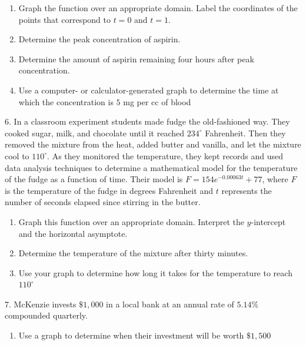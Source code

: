 \documentclass[10pt,]{book}
\theoremstyle{plain}
\theoremstyle{definition}
\theoremstyle{definition}
\theoremstyle{definition}
\numberwithin{equation}{section}
\begin{document}
\begin{exerciselist}
\leavevmode%
\begin{enumerate}[label=(\alph*)]
\item\hypertarget{li-142}{}Graph the function over an appropriate domain. Label the coordinates of the points that correspond to \(t=0\) and \(t=1\).%
\item\hypertarget{li-143}{}Determine the peak concentration of aspirin.%
\item\hypertarget{li-144}{}Determine the amount of aspirin remaining four hours after peak concentration.%
\item\hypertarget{li-145}{}Use a computer- or calculator-generated graph to determine the time at which the concentration is \(5\) mg per cc of blood%
\end{enumerate}
\par\smallskip
\item[6.]\hypertarget{exercise-67}{}\hypertarget{p-263}{}%
In a classroom experiment students made fudge the old-fashioned way.  They cooked sugar, milk, and chocolate until it reached \(234^\circ\) Fahrenheit.  Then they removed the mixture from the heat, added butter and vanilla, and let the mixture cool to \(110^\circ\).  As they monitored the temperature, they kept records and used data analysis techniques to determine a mathematical model for the temperature of the fudge as a function of time.  Their model is \(F = 154e^{-0.00063t} + 77\), where \(F\) is the temperature of the fudge in degrees Fahrenheit and \(t\) represents the number of seconds elapsed since stirring in the butter.%
\leavevmode%
\begin{enumerate}[label=(\alph*)]
\item\hypertarget{li-146}{}Graph this function over an appropriate domain.  Interpret the \(y\)-intercept and the horizontal asymptote.%
\item\hypertarget{li-147}{}Determine the temperature of the mixture after thirty minutes.%
\item\hypertarget{li-148}{}Use your graph to determine how long it takes for the temperature to reach \(110^\circ\)%
\end{enumerate}
\par\smallskip
\item[7.]\hypertarget{exercise-68}{}\hypertarget{p-264}{}%
McKenzie invests \(\$1,000\) in a local bank at an annual rate of \(5.14\%\) compounded quarterly.%
\leavevmode%
\begin{enumerate}[label=(\alph*)]
\item\hypertarget{li-149}{}Use a graph to determine when their investment will be worth \(\$1,500\)%

\end{enumerate}
\end{exerciselist}
\end{document}
